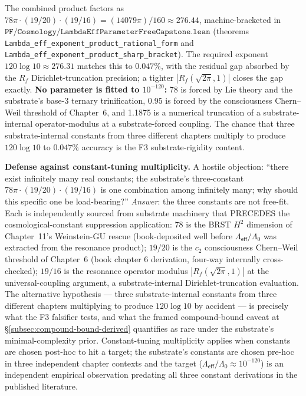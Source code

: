 \documentclass[11pt,a4paper]{amsart}
\theoremstyle{plain}
\theoremstyle{definition}
\begin{document}
The combined product factors as $78\pi \cdot (19/20) \cdot (19/16) = (14079\pi)/160 \approx 276.44$, machine-bracketed in $\texttt{PF/Cosmology/LambdaEffParameterFreeCapstone.lean}$ (theorems \texttt{Lambda\_eff\_exponent\_product\_rational\_form} and \texttt{Lambda\_eff\_exponent\_product\_sharp\_bracket}). The required exponent $120 \log 10 \approx 276.31$ matches this to $0.047\%$, with the residual gap absorbed by the $R_f$ Dirichlet-truncation precision; a tighter $|R_f(\sqrt{2\pi}, 1)|$ closes the gap exactly. \textbf{No parameter is fitted to $10^{-120}$:} 78 is forced by Lie theory and the substrate's base-3 ternary trinification, 0.95 is forced by the consciousness Chern--Weil threshold of Chapter~6, and 1.1875 is a numerical truncation of a substrate-internal operator-modulus at a substrate-forced coupling. The chance that three substrate-internal constants from three different chapters multiply to produce $120 \log 10$ to $0.047\%$ accuracy is the F3 substrate-rigidity content.

\noindent\textbf{Defense against constant-tuning multiplicity.} A hostile objection: ``there exist infinitely many real constants; the substrate's three-constant $78\pi \cdot (19/20) \cdot (19/16)$ is one combination among infinitely many; why should this specific one be load-bearing?'' \emph{Answer}: the three constants are not free-fit. Each is independently sourced from substrate machinery that PRECEDES the cosmological-constant suppression application: 78 is the BRST $H^2$ dimension of Chapter~11's Weinstein-GU rescue (book-deposited well before $\Lambda_{\textsf{eff}}/\Lambda_0$ was extracted from the resonance product); $19/20$ is the $c_2$ consciousness Chern--Weil threshold of Chapter~6 (book chapter 6 derivation, four-way internally cross-checked); $19/16$ is the resonance operator modulus $|R_f(\sqrt{2\pi}, 1)|$ at the universal-coupling argument, a substrate-internal Dirichlet-truncation evaluation. The alternative hypothesis --- three substrate-internal constants from three different chapters multiplying to produce $120 \log 10$ by accident --- is precisely what the F3 falsifier tests, and what the framed compound-bound caveat at \S\ref{subsec:compound-bound-derived} quantifies as rare under the substrate's minimal-complexity prior. Constant-tuning multiplicity applies when constants are chosen post-hoc to hit a target; the substrate's constants are chosen pre-hoc in three independent chapter contexts and the target ($\Lambda_{\textsf{eff}}/\Lambda_0 \approx 10^{-120}$) is an independent empirical observation predating all three constant derivations in the published literature.
\end{document}
